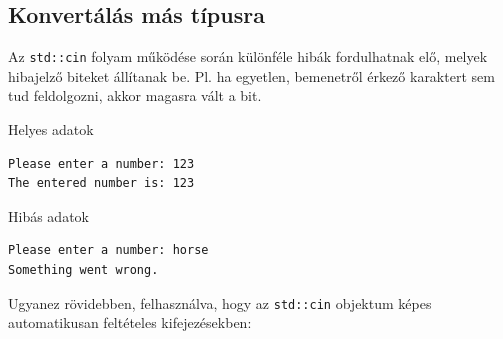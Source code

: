 \documentclass[usenames,dvipsnames,aspectratio=169]{beamer}
\begin{document}
\begin{frame}
    \begin{exampleblock}{}
        \scriptsize
        
        
    \end{exampleblock}
\end{frame}

\subsection{Konvertálás más típusra}

\begin{frame}
    Az \texttt{std::cin} folyam működése során különféle hibák fordulhatnak elő, melyek hibajelző biteket állítanak be. Pl. ha egyetlen, bemenetről érkező karaktert sem tud feldolgozni, akkor magasra vált a  bit.
    \begin{exampleblock}{}
        \footnotesize
        
    \end{exampleblock}
\end{frame}

\begin{frame}[fragile]
    \begin{block}{Helyes adatok}
        \vspace{-.2cm}
        \begin{verbatim}
Please enter a number: 123
The entered number is: 123
\end{verbatim}             
        \vspace{-.2cm}
    \end{block}
    \begin{block}{Hibás adatok}
        \vspace{-.2cm}
        \begin{verbatim}
Please enter a number: horse
Something went wrong.
\end{verbatim}             
        \vspace{-.2cm}
    \end{block}
\end{frame}

\begin{frame}
    Ugyanez rövidebben, felhasználva, hogy az \texttt{std::cin} objektum képes automatikusan  feltételes kifejezésekben:
    \begin{exampleblock}{}
        \footnotesize
        
    \end{exampleblock}
\end{frame}
\end{document}
